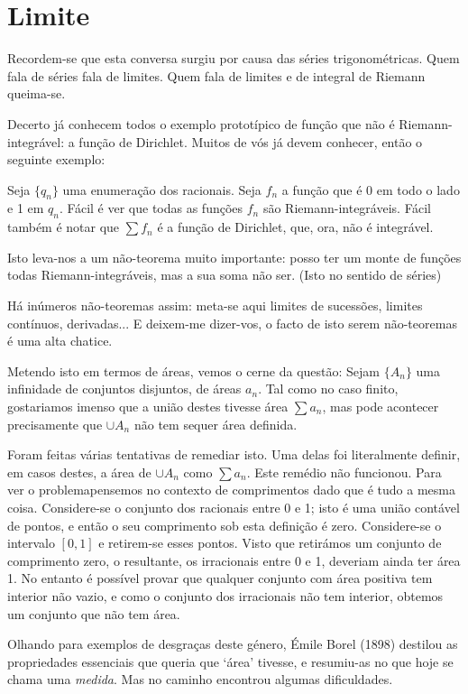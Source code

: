 \documentclass{article}
\begin{document}
\section{Limite}

Recordem-se que esta conversa surgiu por causa das séries trigonométricas. Quem fala de séries fala de limites. Quem fala de limites e de integral de Riemann queima-se.

Decerto já conhecem todos o exemplo prototípico de função que não é Riemann-integrável: a função de Dirichlet. Muitos de vós já devem conhecer, então o seguinte exemplo:

Seja $\{q_n\}$ uma enumeração dos racionais. Seja $f_n$ a função que é 0 em todo o lado e 1 em $q_n$. Fácil é ver que todas as funções $f_n$ são Riemann-integráveis. Fácil também é notar que $\sum f_n$ é a função de Dirichlet, que, ora, não é integrável.

Isto leva-nos a um não-teorema muito importante: posso ter um monte de funções todas Riemann-integráveis, mas a sua soma não ser. (Isto no sentido de séries)

Há inúmeros não-teoremas assim: meta-se aqui limites de sucessões, limites contínuos, derivadas... E deixem-me dizer-vos, o facto de isto serem não-teoremas é uma alta chatice.

Metendo isto em termos de áreas, vemos o cerne da questão: Sejam $\{A_n\}$ uma infinidade de conjuntos disjuntos, de áreas $a_n$. Tal como no caso finito, gostariamos imenso que a união destes tivesse área $\sum a_n$, mas pode acontecer precisamente que $\cup A_n$ não tem sequer área definida.

Foram feitas várias tentativas de remediar isto. Uma delas foi literalmente definir, em casos destes, a área de $\cup A_n$ como $\sum a_n$. Este remédio não funcionou. Para ver o problemapensemos no contexto de comprimentos dado que é tudo a mesma coisa. Considere-se o conjunto dos racionais entre 0 e 1; isto é uma união contável de pontos, e então o seu comprimento sob esta definição é zero. Considere-se o intervalo $[0,1]$ e retirem-se esses pontos. Visto que retirámos um conjunto de comprimento zero, o resultante, os irracionais entre 0 e 1, deveriam ainda ter área 1. No entanto é possível provar que qualquer conjunto com área positiva tem interior não vazio, e como o conjunto dos irracionais não tem interior, obtemos um conjunto que não tem área.

Olhando para exemplos de desgraças deste género, Émile Borel (1898) destilou as propriedades essenciais que queria que `área' tivesse, e resumiu-as no que hoje se chama uma \emph{medida}. Mas no caminho encontrou algumas dificuldades.
\end{document}
